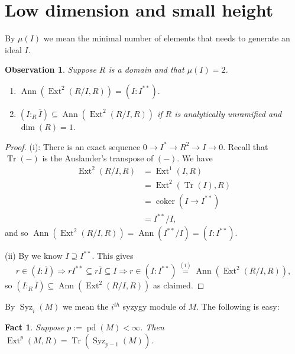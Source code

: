 \documentclass[11pt,a4paper]{amsart}
\numberwithin{equation}{section}
\newtheorem{fact}[theorem]{Fact}
\newtheorem{observation}[theorem]{Observation}
\DeclareMathOperator{\coker}{coker}
\DeclareMathOperator{\Ann}{Ann}\DeclareMathOperator{\ann}{Ann}
\DeclareMathOperator{\Tr}{Tr}\DeclareMathOperator{\tr}{tr}
\DeclareMathOperator{\pd}{pd}
\DeclareMathOperator{\Ext}{Ext}
\DeclareMathOperator{\Syz}{Syz}
\begin{document}
	\maketitle
	
\section{Low dimension and small height}

 
By $\mu(I)$ we mean the minimal number of elements that needs to generate an ideal $I$.



\begin{observation} \label{2e}Suppose $R$ is a domain and that $\mu(I) = 2$.
	
	\begin{enumerate}
		\item[(i)]  
		\(\ann 
		(\Ext^2(R/I,R)) = (I:I^{**}).
		\)
		
		\item[(ii)]  $(I:_R\overline{I})  \subseteq\Ann(\Ext^2(R/I,R))$ if 
	$R$ is analytically unramified and	$\dim (R) = 1$.
	\end{enumerate}
\end{observation} 

\begin{proof} (i): There is an  exact sequence  
	$0\rightarrow I^* \rightarrow R^2 \rightarrow I \rightarrow 0$.
	Recall that $\Tr(-)$ is the Auslander's transpose  of $(-)$. We have
	\[
	\begin{array}{ll}
	\Ext^2(R/I,R) &= \Ext^1(I,R) \\
	&= \Ext^2(\Tr(I),R) \\
	&= \coker(I\to I^{**})\\
	&=I^{**}/I,
	\end{array}
	\] 
	and so \(\ann (
	\Ext^2(R/I,R)) = \ann (I^{**}/I)=  (I:I^{**}).
	\)

(ii)	 By \cite[2.14]{corso} we know $\overline{I} \supseteq I^{**}$. This gives
	$$
	r \in (I:\overline{I}) \Rightarrow rI^{**}\subseteq r\overline{I}\subseteq I  \Rightarrow r\in (I:I^{**})
	\stackrel{(i)}=\Ann(\Ext^2(R/I,R)) ,
	$$so $(I:_R\overline{I})  \subseteq\Ann(\Ext^2(R/I,R))$ as claimed.
\end{proof}
By  $\Syz_{i}(M)$ we mean the $i^{th}$  syzygy module of $M$. The following is easy:
\begin{fact}\label{ep}
	Suppose $p:=\pd(M)<	\infty$. Then $\Ext^p(M,R)=\Tr(\Syz_{p-1}(M))$.
\end{fact}
\end{document}

